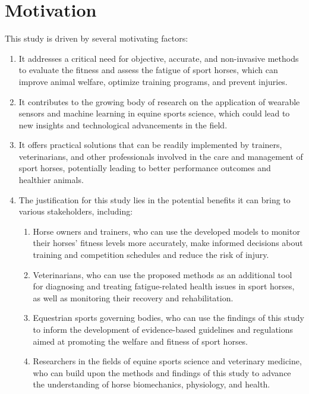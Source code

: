 \section{Motivation}
\label{sec:motivation}

This study is driven by several motivating factors:
\begin{enumerate}
    \item It addresses a critical need for objective, accurate, and non-invasive methods to evaluate the fitness and assess the fatigue of sport horses, which can improve animal welfare, optimize training programs, and prevent injuries.
    \item It contributes to the growing body of research on the application of wearable sensors and machine learning in equine sports science, which could lead to new insights and technological advancements in the field.
    \item It offers practical solutions that can be readily implemented by trainers, veterinarians, and other professionals involved in the care and management of sport horses, potentially leading to better performance outcomes and healthier animals. 
    \item The justification for this study lies in the potential benefits it can bring to various stakeholders, including:
	\begin{enumerate}
	    \item Horse owners and trainers, who can use the developed models to monitor their horses' fitness levels more accurately, make informed decisions about training and competition schedules and reduce the risk of injury.
        \item Veterinarians, who can use the proposed methods as an additional tool for diagnosing and treating fatigue-related health issues in sport horses, as well as monitoring their recovery and rehabilitation.
        \item Equestrian sports governing bodies, who can use the findings of this study to inform the development of evidence-based guidelines and regulations aimed at promoting the welfare and fitness of sport horses.
        \item Researchers in the fields of equine sports science and veterinary medicine, who can build upon the methods and findings of this study to advance the understanding of horse biomechanics, physiology, and health.
\end{enumerate}
\end{enumerate}